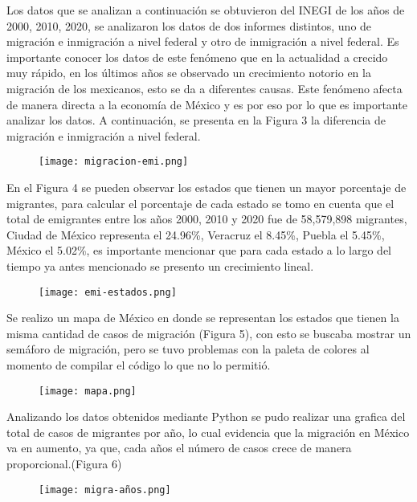 \documentclass{article}
\begin{document}
Los datos que se analizan a continuación se obtuvieron del INEGI de los años de 2000, 2010, 2020, se analizaron los datos de dos informes distintos, uno de migración e inmigración a nivel federal y otro de inmigración a nivel federal. Es importante conocer los datos de este fenómeno que en la actualidad a crecido muy rápido, en los últimos años se observado un crecimiento notorio en la migración de los mexicanos, esto se da a diferentes causas. Este fenómeno afecta de manera directa a la economía de México y es por eso por lo que es importante analizar los datos. 
A continuación, se presenta en la Figura 3 la diferencia de migración e inmigración a nivel federal.
\begin{figure}[!] 
  \texttt{[image: migracion-emi.png]}
  \centering
  \caption{ }
  \label{fig:Lista-mes.jpg.}
\end{figure}

En el Figura 4 se pueden observar los estados que tienen un mayor porcentaje de migrantes, para calcular el porcentaje de cada estado se tomo en cuenta que el total de emigrantes entre los años 2000, 2010 y 2020 fue de 58,579,898 migrantes, Ciudad de México representa el 24.96\%, Veracruz el 8.45\%, Puebla el 5.45\%, México el 5.02\%, es importante mencionar que para cada estado a lo largo del tiempo ya antes mencionado se presento un crecimiento lineal.
\begin{figure}[!] 
  \texttt{[image: emi-estados.png]}
  \centering
  \caption{ }
  \label{fig:Lista-mes.jpg.}
\end{figure}
Se realizo un mapa de México en donde se representan los estados que tienen la misma cantidad de casos de migración (Figura 5), con esto se buscaba mostrar un semáforo de migración, pero se tuvo problemas con la paleta de colores al momento de compilar el código lo que no lo permitió.\\

\begin{figure}[!] 
  \texttt{[image: mapa.png]}
  \centering
  \caption{ }
  \label{fig:Lista-mes.jpg.}
\end{figure}
Analizando los datos obtenidos mediante Python se pudo realizar una grafica del total de casos de migrantes por año, lo cual evidencia que la migración en México va en aumento, ya que, cada años el número de casos crece de manera proporcional.(Figura 6)\\
\begin{figure}[!] 
  \texttt{[image: migra-años.png]}
  \centering
  \caption{ }
  \label{fig:Lista-mes.jpg.}
\end{figure}
\end{document}
